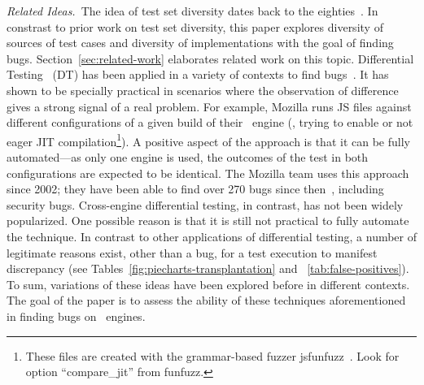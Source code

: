 \documentclass[sigconf,review, anonymous]{acmart}
\begin{document}
\emph{Related Ideas.}~The idea of test set diversity dates back to the
eighties~\cite{white-cohen-tse1980, ostrand-balcer-1988}. In constrast
to prior work on test set diversity, this paper explores diversity of
sources of test cases and diversity of implementations with the goal
of finding bugs. Section~\ref{sec:related-work} elaborates related
work on this topic. Differential Testing~\cite{Brumley-etal-ss07} (DT)
has been applied in a variety of contexts to find
bugs~\cite{Yang-etal-pldi11,Chen-etal-fse2015,Argyros-etla-ccs16,Chen-etal-pldi16,petsios-etal-sp2017,SivakornAPKJ17,Zhang:2017:ATD:3097368.3097448}.
It has shown to be specially practical in scenarios where the
observation of difference gives a strong signal of a real problem. For
example, Mozilla runs JS files against different configurations of
a given build of their \smonkey\ engine (\eg{}, trying to enable or
not eager JIT compilation\footnote{These files are created with
  the grammar-based fuzzer jsfunfuzz~\cite{jsfunfuzz}. Look for option
  ``compare\_jit'' from funfuzz.}). A positive aspect of the approach is that
it can be fully automated---as only one engine is used, the outcomes
of the test in both configurations are expected to be identical. The
Mozilla team uses this approach since 2002; they have been able to
find over 270 bugs since then~\cite{jsfunfuzz-at-mozilla}, including
security bugs. Cross-engine differential testing, in contrast, has not
been widely popularized. One possible reason is that it is still not
practical to fully automate the technique. In contrast to other
applications of differential testing, a number of legitimate reasons
exist, other than a bug, for a test execution to manifest discrepancy
(see Tables~\ref{fig:piecharts-transplantation} and
~\ref{tab:false-positives}). To sum, variations of these ideas have
been explored before in different contexts.  The goal of the paper is
to assess the ability of these techniques aforementioned in finding
bugs on \javascript\ engines.



\end{document}
